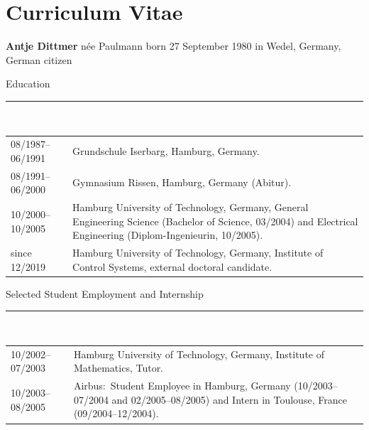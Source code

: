 \chapter*{Curriculum Vitae}
{}
\noindent\textbf{\large Antje Dittmer} \large  n\'ee Paulmann \normalsize born 27 September 1980 in Wedel, Germany, German citizen
\bigskip

\large Education\\[-8pt]
\noindent\rule{15.25cm}{0.4pt}\\[3pt]
\normalsize
\begin{tabular}{@{}p{3.2cm}p{11.3cm}@{}}
    08/1987--06/1991 & Grundschule Iserbarg, Hamburg, Germany. \\[5pt]
    08/1991--06/2000 & Gymnasium Rissen, Hamburg, Germany %
    (Abitur). \\ [5pt]
    10/2000--10/2005 & Hamburg University of Technology, Germany, %
    General Engineering Science (Bachelor of Science, 03/2004) and 
    Electrical Engineering (Diplom-Ingenieurin, 10/2005). \\[13pt]
    since 12/2019 & Hamburg University of Technology, Germany, Institute of Control Systems,
    external doctoral candidate.
\end{tabular}

\bigskip
\large Selected Student Employment and Internship\\[-8pt]
\noindent\rule{15.25cm}{0.4pt}\\[3pt]
\normalsize
\begin{tabular}{@{}p{3.2cm}p{11.3cm}@{}}
    10/2002--07/2003 &  Hamburg University of Technology, Germany, Institute of Mathematics,  %
    Tutor. \\[9pt]
    10/2003--08/2005 & Airbus:~Student Employee in Hamburg, Germany (10/2003--07/2004 and 02/2005--08/2005) and Intern in Toulouse, France (09/2004--12/2004).\\
\end{tabular}

